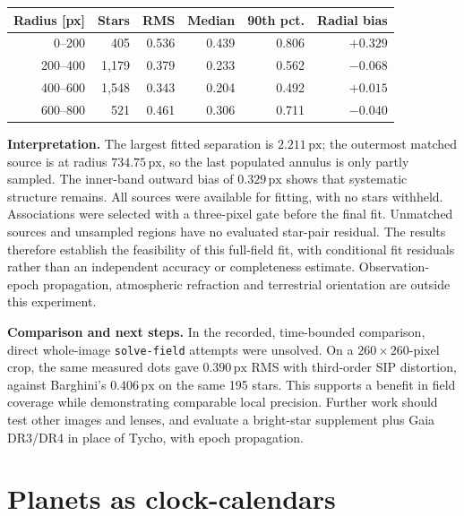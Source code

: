 \documentclass[12pt,a4paper]{article}
\newcommand{\px}{\,\mathrm{px}}
\begin{document}
\begin{center}
\label{tab:radial}
\smallskip
\begin{tabular}{@{}rrrrrr@{}}
\toprule
Radius [px] & Stars & RMS & Median & 90th pct. & Radial bias \\
\midrule
0--200   & 405   & 0.536 & 0.439 & 0.806 & $+0.329$ \\
200--400 & 1,179 & 0.379 & 0.233 & 0.562 & $-0.068$ \\
400--600 & 1,548 & 0.343 & 0.204 & 0.492 & $+0.015$ \\
600--800 & 521   & 0.461 & 0.306 & 0.711 & $-0.040$ \\
\bottomrule
\end{tabular}
\end{center}

\textbf{Interpretation.}
The largest fitted separation is $2.211\px$; the outermost matched source
is at radius $734.75\px$, so the last populated annulus is only partly
sampled. The inner-band outward bias of $0.329\px$ shows that systematic
structure remains. All sources were available for fitting, with no stars
withheld. Associations were selected with a three-pixel gate before the
final fit. Unmatched sources and unsampled regions have no evaluated
star-pair residual. The results therefore establish the feasibility of this
full-field fit, with conditional fit residuals rather than an independent
accuracy or completeness estimate. Observation-epoch propagation, atmospheric
refraction and terrestrial orientation are outside this experiment.

\textbf{Comparison and next steps.}
In the recorded, time-bounded comparison, direct whole-image
\texttt{solve-field} attempts were unsolved. On a $260\times260$-pixel crop,
the same measured dots gave $0.390\px$ RMS with third-order SIP distortion,
against Barghini's $0.406\px$ on the same 195 stars. This supports a benefit
in field coverage while demonstrating comparable local precision.
Further work should test other images and lenses, and evaluate a bright-star
supplement plus Gaia DR3/DR4 in place of Tycho, with epoch propagation.

\clearpage
\section*{Planets as clock-calendars}
\label{sec:planets}
\end{document}
